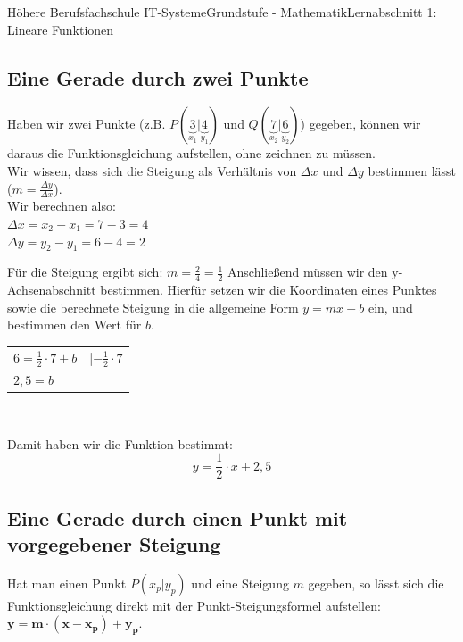 \documentclass[11pt,twocolumn,oneside,openany,headings=optiontotoc,11pt,numbers=noenddot]{article}
\begin{document}
\begin{worksheet}{Höhere Berufsfachschule IT-Systeme}{Grundstufe - 
		Mathematik}{Lernabschnitt 1: Lineare Funktionen}
		\subsection{Eine Gerade durch zwei Punkte}
		Haben wir zwei Punkte (z.B. \(P(\underbrace{3}_{x_1}|\underbrace{4}_{y_1})\) und \(Q(\underbrace{7}_{x_2}|\underbrace{6}_{y_2})\)) gegeben, können wir daraus die Funktionsgleichung aufstellen, ohne zeichnen zu müssen.\\
		Wir wissen, dass sich die Steigung als Verhältnis von \(\Delta{}x\) und \(\Delta{}y\) bestimmen lässt (\(m = \frac{\Delta{}y}{\Delta{}x}\)).\\
		Wir berechnen also:\\
		\(\Delta{}x = x_2-x_1 = 7-3 = 4\)\\
		\(\Delta{}y = y_2-y_1 = 6-4 = 2\)\\
		\par\noindent
		Für die Steigung ergibt sich: \(m =\frac{2}{4} = \frac{1}{2}\)
		Anschließend müssen wir den y-Achsenabschnitt bestimmen. Hierfür setzen wir die Koordinaten eines Punktes sowie die berechnete Steigung in die allgemeine Form \(y = mx +b\) ein, und bestimmen den Wert für \(b\).\\
		\par\noindent
		\begin{tabularx}{0.48\textwidth}{ll}
			\(6 = \frac{1}{2}\cdot{}7 + b\) & |\(-\frac{1}{2}\cdot{}7\)\\
			\(2,5 = b\)
		\end{tabularx}\\
		\par\noindent
		Damit haben wir die Funktion bestimmt:
		\[y = \frac{1}{2}\cdot{}x + 2,5\]
		\subsection{Eine Gerade durch einen Punkt mit vorgegebener Steigung}
		Hat man einen Punkt \(P(x_p|y_p)\) und eine Steigung \(m\) gegeben, so lässt sich die Funktionsgleichung direkt mit der Punkt-Steigungsformel aufstellen: \(\mathbf{y=m\cdot{}(x-x_p) + y_p}\).\\

\end{worksheet}
\end{document}
